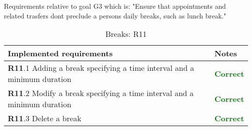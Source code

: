 Requirements relative to goal G3 which is: "Ensure that appointments and related trasfers dont preclude a persons daily breaks, such as lunch break."


\begin{flushleft}

\begin{table}[htp]

\begin{tabular}{p{3cm}|p{10cm}}
\bf\large Implemented requirements&\bf\large Notes\\
\hline
\hline
\textbf{R11}.1 Adding a break specifying a time interval and a minimum duration&\large\bf\textcolor{green}{Correct}\\
\hline
\textbf{R11}.2 Modify a break specifying a time interval and a minimum duration&\large\bf\textcolor{green}{Correct}\\
\hline
\textbf{R11}.3 Delete a break&\large\bf\textcolor{green}{Correct}\\
\hline

\end{tabular}

\caption{Breaks: R11} 
\label{tab:R11}

\end{table}

\end{flushleft}


